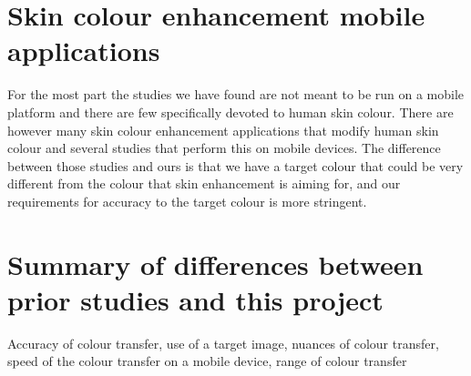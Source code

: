 \section{Skin colour enhancement mobile applications}
For the most part the studies we have found are not meant to be run on a mobile platform and there are few specifically devoted to human skin colour. There are however many skin colour enhancement applications that modify human skin colour and several studies that perform this on mobile devices. 
The difference between those studies and ours is that we have a target colour that could be very different from the colour that skin enhancement is aiming for, and our requirements for accuracy to the target colour is more stringent.

\section{Summary of differences between prior studies and this project}
Accuracy of colour transfer, use of a target image, nuances of colour transfer, speed of the colour transfer on a mobile device, range of colour transfer



